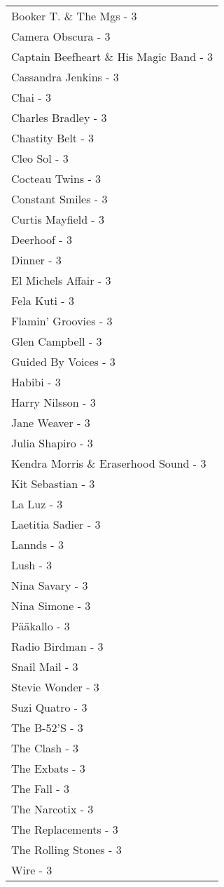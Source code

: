 \documentclass[
]{article}
\begin{document}
\begin{longtable}{l}
Booker T. \& The Mgs - 3 \\ 
Camera Obscura - 3 \\ 
Captain Beefheart \& His Magic Band - 3 \\ 
Cassandra Jenkins - 3 \\ 
Chai - 3 \\ 
Charles Bradley - 3 \\ 
Chastity Belt - 3 \\ 
Cleo Sol - 3 \\ 
Cocteau Twins - 3 \\ 
Constant Smiles - 3 \\ 
Curtis Mayfield - 3 \\ 
Deerhoof - 3 \\ 
Dinner - 3 \\ 
El Michels Affair - 3 \\ 
Fela Kuti - 3 \\ 
Flamin' Groovies - 3 \\ 
Glen Campbell - 3 \\ 
Guided By Voices - 3 \\ 
Habibi - 3 \\ 
Harry Nilsson - 3 \\ 
Jane Weaver - 3 \\ 
Julia Shapiro - 3 \\ 
Kendra Morris \& Eraserhood Sound - 3 \\ 
Kit Sebastian - 3 \\ 
La Luz - 3 \\ 
Laetitia Sadier - 3 \\ 
Lannds - 3 \\ 
Lush - 3 \\ 
Nina Savary - 3 \\ 
Nina Simone - 3 \\ 
Pääkallo - 3 \\ 
Radio Birdman - 3 \\ 
Snail Mail - 3 \\ 
Stevie Wonder - 3 \\ 
Suzi Quatro - 3 \\ 
The B-52'S - 3 \\ 
The Clash - 3 \\ 
The Exbats - 3 \\ 
The Fall - 3 \\ 
The Narcotix - 3 \\ 
The Replacements - 3 \\ 
The Rolling Stones - 3 \\ 
Wire - 3 \\ 

\end{longtable}
\end{document}
